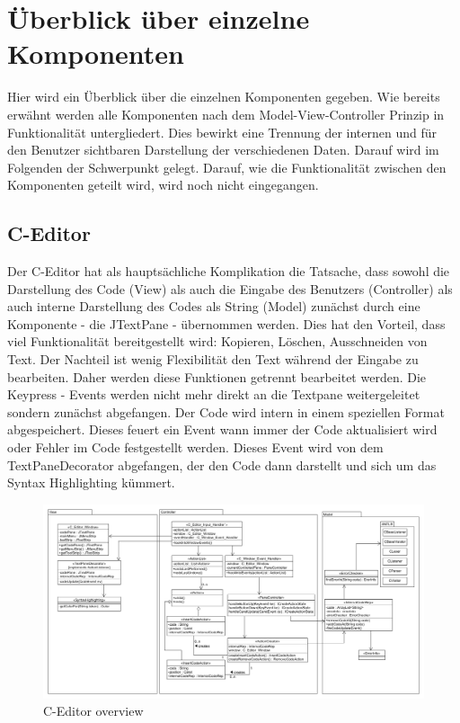 \documentclass[a4paper]{scrreprt}
\begin{document}
\section{Überblick über einzelne Komponenten}
Hier wird ein Überblick über die einzelnen Komponenten gegeben. Wie bereits erwähnt werden alle Komponenten nach dem Model-View-Controller Prinzip in Funktionalität untergliedert. Dies bewirkt eine Trennung der internen und für den Benutzer sichtbaren Darstellung der verschiedenen Daten. Darauf wird im Folgenden der Schwerpunkt gelegt. Darauf, wie die Funktionalität zwischen den Komponenten geteilt wird, wird noch nicht eingegangen.

\subsection{C-Editor}
Der C-Editor hat als hauptsächliche Komplikation die Tatsache, dass sowohl die Darstellung des Code (View) als auch die Eingabe des Benutzers (Controller) als auch interne Darstellung des Codes als String (Model) zunächst durch eine Komponente - die JTextPane - übernommen werden. Dies hat den Vorteil, dass viel Funktionalität bereitgestellt wird: Kopieren, Löschen, Ausschneiden von Text. Der Nachteil ist wenig Flexibilität den Text während der Eingabe zu bearbeiten. Daher werden diese Funktionen getrennt bearbeitet werden. Die Keypress - Events werden nicht mehr direkt an die Textpane weitergeleitet sondern zunächst abgefangen. Der Code wird intern in einem speziellen Format abgespeichert. Dieses feuert ein Event wann immer der Code aktualisiert wird oder Fehler im Code festgestellt werden. Dieses Event wird von dem TextPaneDecorator abgefangen, der den Code dann darstellt und sich um das Syntax Highlighting kümmert. 


\begin{figure}[H]
\includegraphics[scale=0.4, angle = 270]{CEditorMVC.png}
\caption{C-Editor overview}
\label{C-Editor-MVC-overview}
\end{figure}
\end{document}
